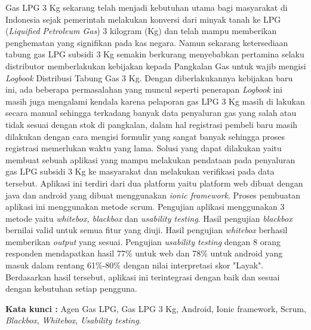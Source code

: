 \begin{abstractind}
Gas LPG 3 Kg sekarang telah menjadi kebutuhan utama bagi masyarakat di Indonesia sejak pemerintah melakukan konversi dari minyak tanah ke LPG (\textit{Liquified Petroleum Gas}) 3 kilogram (Kg) dan telah mampu memberikan penghematan yang signifikan pada kas negara. Namun sekarang ketersediaan tabung gas LPG subsidi 3 Kg semakin berkurang menyebabkan pertamina selaku distributor memberlakukan kebijakan kepada Pangkalan Gas untuk wajib mengisi \textit{Logbook} Distribusi Tabung Gas 3 Kg. Dengan diberlakukannya kebijakan baru ini, ada beberapa permasalahan yang muncul seperti penerapan \textit{Logbook} ini masih juga mengalami kendala karena pelaporan gas LPG 3 Kg masih di lakukan secara manual sehingga terkadang banyak data penyaluran gas yang salah atau tidak sesuai dengan stok di pangkalan, dalam hal registrasi pembeli baru masih dilakukan dengan cara mengisi formulir yang sangat banyak sehingga proses registrasi memerlukan waktu yang lama. Solusi yang dapat dilakukan yaitu membuat sebuah aplikasi yang mampu melakukan pendataan pada penyaluran gas LPG subsidi 3 Kg ke masyarakat dan melakukan verifikasi pada data tersebut. Aplikasi ini terdiri dari dua platform yaitu platform web dibuat dengan java dan android yang dibuat menggunakan \textit{ionic framework}. Proses pembuatan aplikasi ini menggunakan metode scrum. Pengujian aplikasi menggunakan 3 metode yaitu \textit{whitebox, blackbox} dan \textit{usability testing}. Hasil pengujian \textit{blackbox} bernilai valid untuk semua fitur yang diuji. Hasil pengujian \textit{whitebox} berhasil memberikan \textit{output} yang sesuai. Pengujian \textit{usability testing} dengan 8 orang responden mendapatkan hasil 77\% untuk web dan 78\% untuk android yang masuk dalam rentang 61\%-80\% dengan nilai interpretasi skor "Layak". Berdasarkan hasil tersebut, aplikasi ini terintegrasi dengan baik dan sesuai dengan kebutuhan setiap pengguna. 


\bigskip
\noindent
\textbf{Kata kunci :} Agen Gas LPG, Gas LPG 3 Kg, Android, Ionic framework, Scrum, \textit{Blackbox}, \textit{Whitebox}, \textit{Usability testing}.
\end{abstractind}
